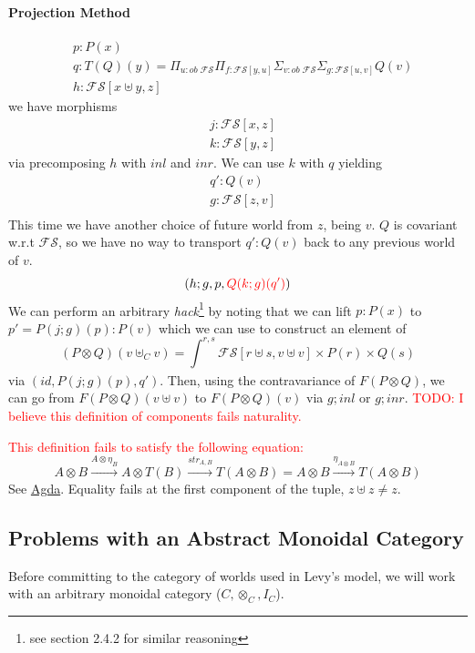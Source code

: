\documentclass{article}
\newcommand{\red}[1]{\textcolor{red}{#1}}
\begin{document}
\paragraph{Projection Method}
\begin{align*}
    &p : P(x)\\
    &q : T(Q)(y) = \Pi_{u : ob \; \mathcal{FS}}\Pi_{f : \mathcal{FS}[ y , u]}\Sigma_{v : ob \;\mathcal{FS}}\Sigma_{g : \mathcal{FS}[ u , v ]}Q(v)\\
    &h : \mathcal{FS}[x\uplus y , z]
\end{align*}
we have morphisms
\begin{align*}
    & j : \mathcal{FS}[x , z]\\
    & k : \mathcal{FS}[y , z]
\end{align*}
via precomposing $h$ with $inl$ and $inr$. We can use $k$ with $q$ yielding
\begin{align*}
    &q' : Q(v)\\
    &g : \mathcal{FS}[ z , v ]\\
\end{align*}
This time we have another choice of future world from $z$, being $v$. 
$Q$ is covariant w.r.t $\mathcal{FS}$, so we have no way to transport $q' : Q(v)$ back to any
previous world of $v$.
\[
  (h ; g , p, \red{Q(k ; g)(q')})  
\]
We can perform an arbitrary \textit{hack}\footnote{see section 2.4.2 for similar reasoning}
by noting that we can lift $p: P(x)$ to $p' = P(j ; g)(p) : P(v)$ which we can use to construct an element of 
\[
    (P \otimes Q)(v \uplus_C v) = \int_{}^{r,s} \mathcal{FS}[r \uplus s, v \uplus v] 
    \times P(r) \times Q(s)
\]
via $(id, P(j ; g)(p), q')$. 
Then, using the contravariance of $F(P \otimes Q)$, 
we can go from $F(P \otimes Q)(v \uplus v)$ to $F(P \otimes Q)(v)$ via $g ; inl$ or $g ; inr$.
\red{TODO: I believe this definition of components fails naturality.}

\red{This definition fails to satisfy the following equation: }
\[
  A \otimes B \xrightarrow{A \otimes \eta_B} A \otimes T(B) \xrightarrow{str_{A,B}} T(A \otimes B) 
  = A \otimes B \xrightarrow{\eta_{A\otimes B}}T(A \otimes B)
\]
See \href{https://github.com/bond15/Bunched-CBPV/blob/b77d06a7207a6d42b86633f52a9fe93f6beaafd1/src/Data/ConcreteFin.agda#L197}{Agda}.
 Equality fails at the first component of the tuple, $z \uplus z \neq z$.


\subsection{Problems with an Abstract Monoidal Category}
Before committing to the category 
of worlds used in Levy's model, we will work with an arbitrary monoidal category ($C, \otimes_C , I_C$). 
\end{document}
